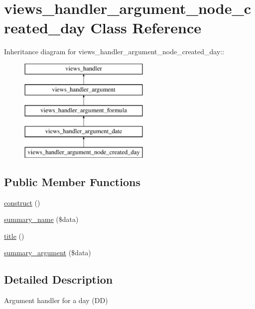 \hypertarget{classviews__handler__argument__node__created__day}{
\section{views\_\-handler\_\-argument\_\-node\_\-created\_\-day Class Reference}
\label{classviews__handler__argument__node__created__day}
}
Inheritance diagram for views\_\-handler\_\-argument\_\-node\_\-created\_\-day::\begin{figure}[H]
\begin{center}
\leavevmode
\includegraphics[height=5cm]{classviews__handler__argument__node__created__day}
\end{center}
\end{figure}
\subsection*{Public Member Functions}
\begin{DoxyCompactItemize}
\item 
\hyperlink{classviews__handler__argument__node__created__day_aeb33813a3cc0da642e45a12625da5bde}{construct} ()
\item 
\hyperlink{classviews__handler__argument__node__created__day_acd7fa6e862306ba955d314d464e1cf2d}{summary\_\-name} (\$data)
\item 
\hyperlink{classviews__handler__argument__node__created__day_abf71aafe50941da8e9ad6b4e1627833a}{title} ()
\item 
\hyperlink{classviews__handler__argument__node__created__day_ac7f626914f87a04112962bf39d49d454}{summary\_\-argument} (\$data)
\end{DoxyCompactItemize}


\subsection{Detailed Description}
Argument handler for a day (DD) 

